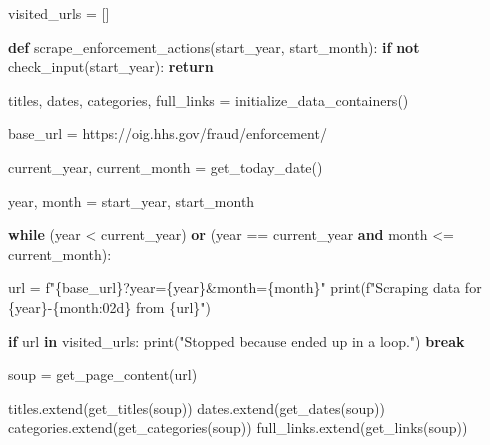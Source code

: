 \documentclass[
  letterpaper,
  DIV=11,
  numbers=noendperiod]{scrartcl}
\newenvironment{Shaded}{\begin{snugshade}}{\end{snugshade}}
\newcommand{\BuiltInTok}[1]{\textcolor[rgb]{0.00,0.23,0.31}{#1}}
\newcommand{\ControlFlowTok}[1]{\textcolor[rgb]{0.00,0.23,0.31}{\textbf{#1}}}
\newcommand{\KeywordTok}[1]{\textcolor[rgb]{0.00,0.23,0.31}{\textbf{#1}}}
\newcommand{\NormalTok}[1]{\textcolor[rgb]{0.00,0.23,0.31}{#1}}
\newcommand{\OperatorTok}[1]{\textcolor[rgb]{0.37,0.37,0.37}{#1}}
\newcommand{\SpecialCharTok}[1]{\textcolor[rgb]{0.37,0.37,0.37}{#1}}
\newcommand{\SpecialStringTok}[1]{\textcolor[rgb]{0.13,0.47,0.30}{#1}}
\newcommand{\StringTok}[1]{\textcolor[rgb]{0.13,0.47,0.30}{#1}}
\begin{document}
\begin{Shaded}
\begin{Highlighting}[]
\NormalTok{visited\_urls }\OperatorTok{=}\NormalTok{ []}

\KeywordTok{def}\NormalTok{ scrape\_enforcement\_actions(start\_year, start\_month):}
    \ControlFlowTok{if} \KeywordTok{not}\NormalTok{ check\_input(start\_year):}
        \ControlFlowTok{return}

\NormalTok{    titles, dates, categories, full\_links }\OperatorTok{=}\NormalTok{ initialize\_data\_containers()}
    
\NormalTok{    base\_url }\OperatorTok{=} \StringTok{\textquotesingle{}https://oig.hhs.gov/fraud/enforcement/\textquotesingle{}}
    
\NormalTok{    current\_year, current\_month }\OperatorTok{=}\NormalTok{ get\_today\_date()}
    
    
\NormalTok{    year, month }\OperatorTok{=}\NormalTok{ start\_year, start\_month}
    
    \ControlFlowTok{while}\NormalTok{ (year }\OperatorTok{\textless{}}\NormalTok{ current\_year) }\KeywordTok{or}\NormalTok{ (year }\OperatorTok{==}\NormalTok{ current\_year }\KeywordTok{and}\NormalTok{ month }\OperatorTok{\textless{}=}\NormalTok{ current\_month):}
        
\NormalTok{        url }\OperatorTok{=} \SpecialStringTok{f"}\SpecialCharTok{\{}\NormalTok{base\_url}\SpecialCharTok{\}}\SpecialStringTok{?year=}\SpecialCharTok{\{}\NormalTok{year}\SpecialCharTok{\}}\SpecialStringTok{\&month=}\SpecialCharTok{\{}\NormalTok{month}\SpecialCharTok{\}}\SpecialStringTok{"}
        \BuiltInTok{print}\NormalTok{(}\SpecialStringTok{f"Scraping data for }\SpecialCharTok{\{}\NormalTok{year}\SpecialCharTok{\}}\SpecialStringTok{{-}}\SpecialCharTok{\{}\NormalTok{month}\SpecialCharTok{:02d\}}\SpecialStringTok{ from }\SpecialCharTok{\{}\NormalTok{url}\SpecialCharTok{\}}\SpecialStringTok{"}\NormalTok{)}
        
        \ControlFlowTok{if}\NormalTok{ url }\KeywordTok{in}\NormalTok{ visited\_urls:}
            \BuiltInTok{print}\NormalTok{(}\StringTok{"Stopped because ended up in a loop."}\NormalTok{)}
            \ControlFlowTok{break}

\NormalTok{        soup }\OperatorTok{=}\NormalTok{ get\_page\_content(url)}
        
\NormalTok{        titles.extend(get\_titles(soup))}
\NormalTok{        dates.extend(get\_dates(soup))}
\NormalTok{        categories.extend(get\_categories(soup))}
\NormalTok{        full\_links.extend(get\_links(soup))}


\end{Highlighting}
\end{Shaded}
\end{document}
